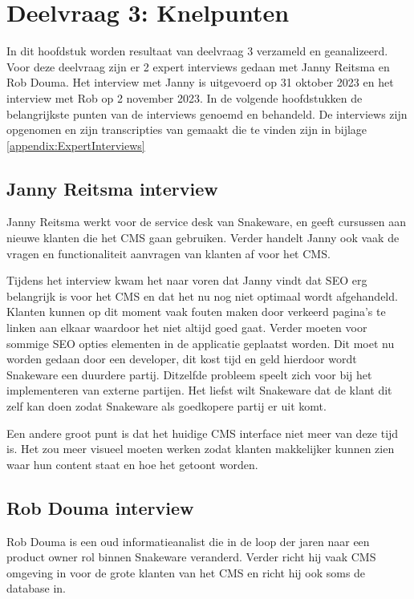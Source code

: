 \section{Deelvraag 3: Knelpunten}
In dit hoofdstuk worden resultaat van deelvraag 3 \textit{\SubquestionThree} verzameld en geanalizeerd.
Voor deze deelvraag zijn er 2 expert interviews gedaan met Janny Reitsma en Rob Douma.
Het interview met Janny is uitgevoerd op 31 oktober 2023 en het interview met Rob op 2 november 2023.
In de volgende hoofdstukken de belangrijkste punten van de interviews genoemd en behandeld.
De interviews zijn opgenomen en zijn transcripties van gemaakt die te vinden zijn in bijlage \ref{appendix:ExpertInterviews}

\subsection{Janny Reitsma interview}
Janny Reitsma werkt voor de service desk van Snakeware, en geeft cursussen aan nieuwe klanten die het CMS gaan gebruiken.
Verder handelt Janny ook vaak de vragen en functionaliteit aanvragen van klanten af voor het CMS.

\whitespace
Tijdens het interview kwam het naar voren dat Janny vindt dat \gls{SEO} erg belangrijk is voor het CMS en dat het nu nog niet optimaal wordt afgehandeld.
Klanten kunnen op dit moment vaak fouten maken door verkeerd pagina's te linken aan elkaar waardoor het niet altijd goed gaat.
Verder moeten voor sommige \gls{SEO} opties elementen in de applicatie geplaatst worden.
Dit moet nu worden gedaan door een developer, dit kost tijd en geld hierdoor wordt Snakeware een duurdere partij.
Ditzelfde probleem speelt zich voor bij het implementeren van externe partijen.
Het liefst wilt Snakeware dat de klant dit zelf kan doen zodat Snakeware als goedkopere partij er uit komt.

\whitespace
Een andere groot punt is dat het huidige CMS interface niet meer van deze tijd is.
Het zou meer visueel moeten werken zodat klanten makkelijker kunnen zien waar hun content staat en hoe het getoont worden.

\subsection{Rob Douma interview}
Rob Douma is een oud informatieanalist die in de loop der jaren naar een product owner rol binnen Snakeware veranderd.
Verder richt hij vaak CMS omgeving in voor de grote klanten van het CMS en richt hij ook soms de database in.

